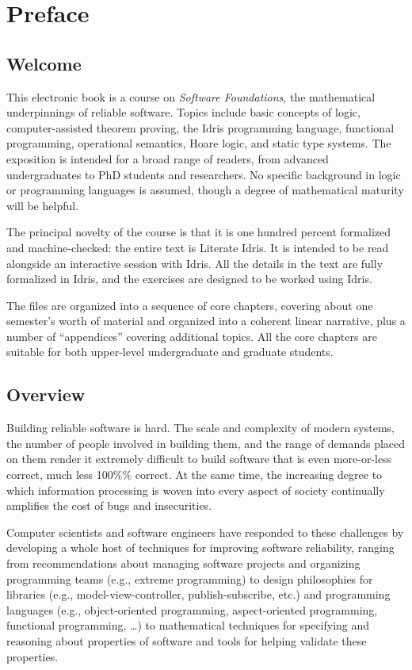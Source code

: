 \chapter{Preface}\label{preface}

\section{Welcome}\label{welcome}

This electronic book is a course on \emph{Software Foundations}, the
mathematical underpinnings of reliable software. Topics include basic
concepts of logic, computer-assisted theorem proving, the Idris
programming language, functional programming, operational semantics,
Hoare logic, and static type systems. The exposition is intended for a
broad range of readers, from advanced undergraduates to PhD students and
researchers. No specific background in logic or programming languages is
assumed, though a degree of mathematical maturity will be helpful.

The principal novelty of the course is that it is one hundred percent
formalized and machine-checked: the entire text is Literate Idris. It is
intended to be read alongside an interactive session with Idris. All the
details in the text are fully formalized in Idris, and the exercises are
designed to be worked using Idris.

The files are organized into a sequence of core chapters, covering about
one semester's worth of material and organized into a coherent linear
narrative, plus a number of ``appendices'' covering additional topics.
All the core chapters are suitable for both upper-level undergraduate
and graduate students.

\section{Overview}\label{overview}

Building reliable software is hard. The scale and complexity of modern
systems, the number of people involved in building them, and the range
of demands placed on them render it extremely difficult to build
software that is even more-or-less correct, much less 100\%\% correct.
At the same time, the increasing degree to which information processing
is woven into every aspect of society continually amplifies the cost of
bugs and insecurities.

Computer scientists and software engineers have responded to these
challenges by developing a whole host of techniques for improving
software reliability, ranging from recommendations about managing
software projects and organizing programming teams (e.g., extreme
programming) to design philosophies for libraries (e.g.,
model-view-controller, publish-subscribe, etc.) and programming
languages (e.g., object-oriented programming, aspect-oriented
programming, functional programming, \ldots{}) to mathematical
techniques for specifying and reasoning about properties of software and
tools for helping validate these properties.

